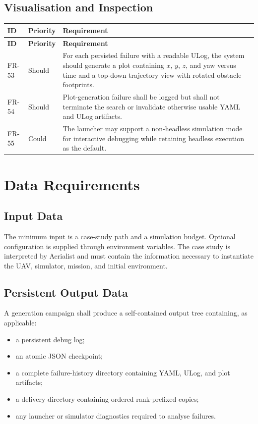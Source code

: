 \documentclass[11pt,a4paper]{report}
\begin{document}
\subsection{Visualisation and Inspection}
\begin{longtable}{L{1.7cm} L{2.1cm} L{10.8cm}}
\toprule
\textbf{ID} & \textbf{Priority} & \textbf{Requirement}\\
\midrule
\endfirsthead
\toprule
\textbf{ID} & \textbf{Priority} & \textbf{Requirement}\\
\midrule
\endhead
FR-53 & Should & For each persisted failure with a readable ULog, the system should generate a plot containing $x$, $y$, $z$, and yaw versus time and a top-down trajectory view with rotated obstacle footprints.\\
FR-54 & Should & Plot-generation failure shall be logged but shall not terminate the search or invalidate otherwise usable YAML and ULog artifacts.\\
FR-55 & Could & The launcher may support a non-headless simulation mode for interactive debugging while retaining headless execution as the default.\\
\bottomrule
\end{longtable}

\section{Data Requirements}
\subsection{Input Data}
The minimum input is a case-study path and a simulation budget. Optional configuration is supplied through environment variables. The case study is interpreted by Aerialist and must contain the information necessary to instantiate the UAV, simulator, mission, and initial environment.

\subsection{Persistent Output Data}
A generation campaign shall produce a self-contained output tree containing, as applicable:
\begin{itemize}
  \item a persistent debug log;
  \item an atomic JSON checkpoint;
  \item a complete failure-history directory containing YAML, ULog, and plot artifacts;
  \item a delivery directory containing ordered rank-prefixed copies;
  \item any launcher or simulator diagnostics required to analyse failures.
\end{itemize}
\end{document}

